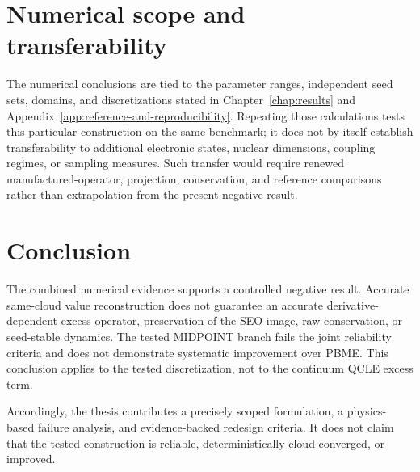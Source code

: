 \section{Numerical scope and transferability}
\label{sec:discussion-numerical-scope}

The numerical conclusions are tied to the parameter ranges, independent seed
sets, domains, and discretizations stated in Chapter~\ref{chap:results} and
Appendix~\ref{app:reference-and-reproducibility}. Repeating those calculations
tests this particular construction on the same benchmark; it does not by
itself establish transferability to additional electronic states, nuclear
dimensions, coupling regimes, or sampling measures. Such transfer would
require renewed manufactured-operator, projection, conservation, and
reference comparisons rather than extrapolation from the present negative
result.

\section{Conclusion}
\label{sec:discussion-conclusions}

The combined numerical evidence supports a controlled negative result.
Accurate same-cloud value reconstruction does not guarantee an accurate
derivative-dependent excess operator, preservation of the SEO image, raw
conservation, or seed-stable dynamics. The tested MIDPOINT branch fails the
joint reliability criteria and does not demonstrate systematic improvement
over PBME. This conclusion applies to the tested discretization, not to the
continuum QCLE excess term.

Accordingly, the thesis contributes a precisely scoped formulation, a
physics-based failure analysis, and evidence-backed redesign criteria. It
does not claim that the tested construction is reliable, deterministically
cloud-converged, or improved.
